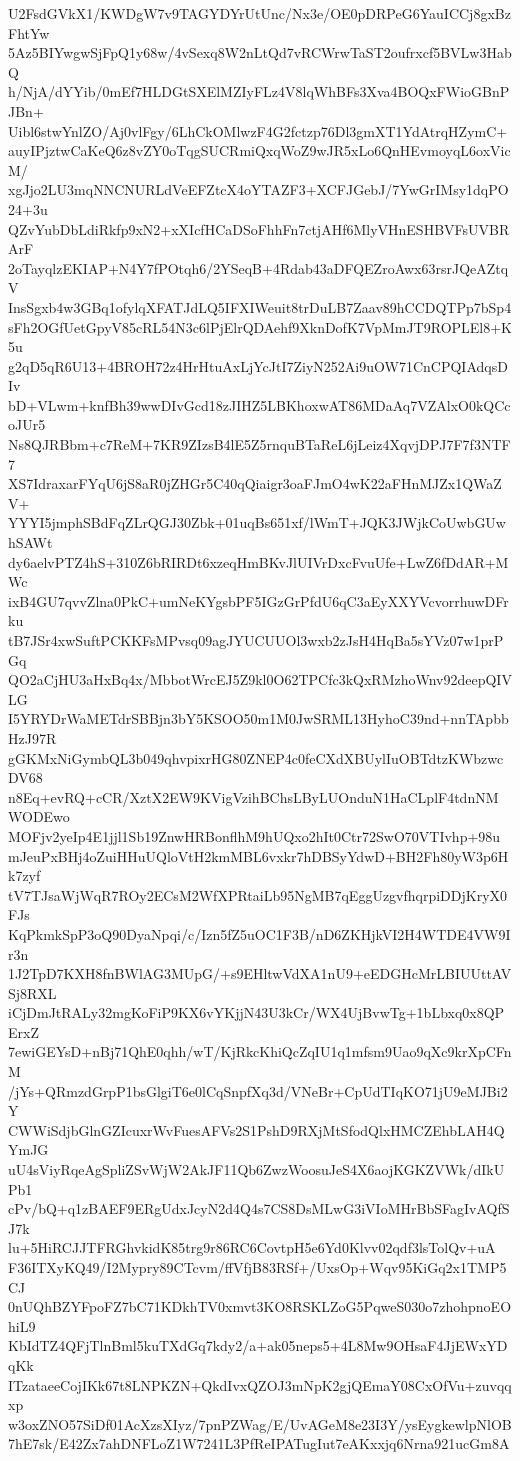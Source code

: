 U2FsdGVkX1/KWDgW7v9TAGYDYrUtUnc/Nx3e/OE0pDRPeG6YauICCj8gxBzFhtYw
5Az5BIYwgwSjFpQ1y68w/4vSexq8W2nLtQd7vRCWrwTaST2oufrxcf5BVLw3HabQ
h/NjA/dYYib/0mEf7HLDGtSXElMZIyFLz4V8lqWhBFs3Xva4BOQxFWioGBnPJBn+
Uibl6stwYnlZO/Aj0vlFgy/6LhCkOMlwzF4G2fctzp76Dl3gmXT1YdAtrqHZymC+
auyIPjztwCaKeQ6z8vZY0oTqgSUCRmiQxqWoZ9wJR5xLo6QnHEvmoyqL6oxVicM/
xgJjo2LU3mqNNCNURLdVeEFZtcX4oYTAZF3+XCFJGebJ/7YwGrIMsy1dqPO24+3u
QZvYubDbLdiRkfp9xN2+xXIcfHCaDSoFhhFn7ctjAHf6MlyVHnESHBVFsUVBRArF
2oTayqlzEKIAP+N4Y7fPOtqh6/2YSeqB+4Rdab43aDFQEZroAwx63rsrJQeAZtqV
InsSgxb4w3GBq1ofylqXFATJdLQ5IFXIWeuit8trDuLB7Zaav89hCCDQTPp7bSp4
sFh2OGfUetGpyV85cRL54N3c6lPjElrQDAehf9XknDofK7VpMmJT9ROPLEl8+K5u
g2qD5qR6U13+4BROH72z4HrHtuAxLjYcJtI7ZiyN252Ai9uOW71CnCPQIAdqsDIv
bD+VLwm+knfBh39wwDIvGcd18zJIHZ5LBKhoxwAT86MDaAq7VZAlxO0kQCcoJUr5
Ns8QJRBbm+c7ReM+7KR9ZIzsB4lE5Z5rnquBTaReL6jLeiz4XqvjDPJ7F7f3NTF7
XS7IdraxarFYqU6jS8aR0jZHGr5C40qQiaigr3oaFJmO4wK22aFHnMJZx1QWaZV+
YYYI5jmphSBdFqZLrQGJ30Zbk+01uqBs651xf/lWmT+JQK3JWjkCoUwbGUwhSAWt
dy6aelvPTZ4hS+310Z6bRIRDt6xzeqHmBKvJlUIVrDxcFvuUfe+LwZ6fDdAR+MWc
ixB4GU7qvvZlna0PkC+umNeKYgsbPF5IGzGrPfdU6qC3aEyXXYVcvorrhuwDFrku
tB7JSr4xwSuftPCKKFsMPvsq09agJYUCUUOl3wxb2zJsH4HqBa5sYVz07w1prPGq
QO2aCjHU3aHxBq4x/MbbotWrcEJ5Z9kl0O62TPCfc3kQxRMzhoWnv92deepQIVLG
I5YRYDrWaMETdrSBBjn3bY5KSOO50m1M0JwSRML13HyhoC39nd+nnTApbbHzJ97R
gGKMxNiGymbQL3b049qhvpixrHG80ZNEP4c0feCXdXBUylIuOBTdtzKWbzwcDV68
n8Eq+evRQ+cCR/XztX2EW9KVigVzihBChsLByLUOnduN1HaCLplF4tdnNMWODEwo
MOFjv2yeIp4E1jjl1Sb19ZnwHRBonflhM9hUQxo2hIt0Ctr72SwO70VTIvhp+98u
mJeuPxBHj4oZuiHHuUQloVtH2kmMBL6vxkr7hDBSyYdwD+BH2Fh80yW3p6Hk7zyf
tV7TJsaWjWqR7ROy2ECsM2WfXPRtaiLb95NgMB7qEggUzgvfhqrpiDDjKryX0FJs
KqPkmkSpP3oQ90DyaNpqi/c/Izn5fZ5uOC1F3B/nD6ZKHjkVI2H4WTDE4VW9Ir3n
1J2TpD7KXH8fnBWlAG3MUpG/+s9EHltwVdXA1nU9+eEDGHcMrLBIUUttAVSj8RXL
iCjDmJtRALy32mgKoFiP9KX6vYKjjN43U3kCr/WX4UjBvwTg+1bLbxq0x8QPErxZ
7ewiGEYsD+nBj71QhE0qhh/wT/KjRkcKhiQcZqIU1q1mfsm9Uao9qXc9krXpCFnM
/jYs+QRmzdGrpP1bsGlgiT6e0lCqSnpfXq3d/VNeBr+CpUdTIqKO71jU9eMJBi2Y
CWWiSdjbGlnGZIcuxrWvFuesAFVs2S1PshD9RXjMtSfodQlxHMCZEhbLAH4QYmJG
uU4sViyRqeAgSpliZSvWjW2AkJF11Qb6ZwzWoosuJeS4X6aojKGKZVWk/dIkUPb1
cPv/bQ+q1zBAEF9ERgUdxJcyN2d4Q4s7CS8DsMLwG3iVIoMHrBbSFagIvAQfSJ7k
lu+5HiRCJJTFRGhvkidK85trg9r86RC6CovtpH5e6Yd0Klvv02qdf3lsTolQv+uA
F36ITXyKQ49/I2Mypry89CTcvm/ffVfjB83RSf+/UxsOp+Wqv95KiGq2x1TMP5CJ
0nUQhBZYFpoFZ7bC71KDkhTV0xmvt3KO8RSKLZoG5PqweS030o7zhohpnoEOhiL9
KbIdTZ4QFjTlnBml5kuTXdGq7kdy2/a+ak05neps5+4L8Mw9OHsaF4JjEWxYDqKk
ITzataeeCojIKk67t8LNPKZN+QkdIvxQZOJ3mNpK2gjQEmaY08CxOfVu+zuvqqxp
w3oxZNO57SiDf01AcXzsXIyz/7pnPZWag/E/UvAGeM8e23I3Y/ysEygkewlpNlOB
7hE7sk/E42Zx7ahDNFLoZ1W7241L3PfReIPATugIut7eAKxxjq6Nrna921ucGm8A
